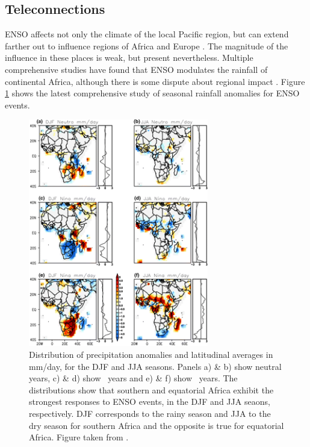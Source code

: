\subsection{Teleconnections}
ENSO affects not only the climate of the local Pacific region, but can extend
farther out to influence regions of Africa and Europe \citep{moron1998}. The
magnitude of the influence in these places is weak, but present
nevertheless. Multiple comprehensive studies \citep{ropelewski1987,
  ropelewski1989, nicholson1996} have found that ENSO modulates the rainfall of
continental Africa, although there is some dispute about regional impact
\citep{wolter1989}. Figure \ref{fig:enso_rainfall_anoms} shows the latest
comprehensive study of seasonal rainfall anomalies for ENSO events.

\begin{figure}
  \centering
  \includegraphics[width=0.7\textwidth]{figures/enso_africa_rainfall_anoms}
  \caption{Distribution of precipitation anomalies and latitudinal averages in
    mm/day, for the DJF and JJA seasons. Panels a) \& b) show neutral years, c)
    \& d) show \elnino\ years and e) \& f) show \nina\ years. The distributions
    show that southern and equatorial Africa exhibit the strongest responses to
    ENSO events, in the DJF and JJA seaons, respectively. DJF corresponds to the
    rainy season and JJA to the dry season for southern Africa and the opposite
    is true for equatorial Africa. Figure taken from \cite{deoliveira2018}.}
  \label{fig:enso_rainfall_anoms}
\end{figure}

